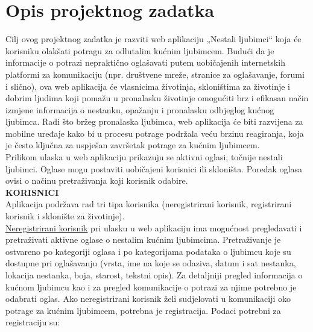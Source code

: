 \chapter{Opis projektnog zadatka}
		
		
		Cilj ovog projektnog zadatka je razviti web aplikaciju „Nestali ljubimci“ koja će korisniku olakšati potragu za odlutalim kućnim ljubimcem. Budući da je informacije o potrazi nepraktično oglašavati putem uobičajenih internetskih platformi za komunikaciju (npr. društvene mreže, stranice za oglašavanje, forumi i slično), ova web aplikacija će vlasnicima životinja, skloništima za životinje i dobrim ljudima koji pomažu u pronalasku životinje omogućiti brz i efikasan način izmjene informacija o nestanku, opažanju i pronalasku odbjeglog kućnog ljubimca. Radi što bržeg pronalaska ljubimca, web aplikacija će biti razvijena za mobilne uređaje kako bi u procesu potrage podržala veću brzinu reagiranja, koja je često ključna za uspješan završetak potrage za kućnim ljubimcem.\\
		
		Prilikom ulaska u web aplikaciju prikazuju se aktivni oglasi, točnije nestali ljubimci. Oglase mogu postaviti uobičajeni korisnici ili skloništa. Poredak oglasa ovisi o načinu pretraživanja koji korisnik odabire. \\
		
		\textbf{KORISNICI}\\
		Aplikacija podržava rad tri tipa korisnika (neregistrirani korisnik, registrirani korisnik i sklonište za životinje).\\
		\underline{Neregistrirani korisnik} pri ulasku u web aplikaciju ima mogućnost pregledavati i pretraživati aktivne oglase o nestalim kućnim ljubimcima. Pretraživanje je ostvareno po kategoriji oglasa i po kategorijama podataka o ljubimcu koje su dostupne pri oglašavanju (vrsta, ime na koje se odaziva, datum i sat nestanka, lokacija nestanka, boja, starost, tekstni opis). Za detaljniji pregled informacija o kućnom ljubimcu kao i za pregled komunikacije o potrazi za njime potrebno je odabrati oglas. Ako neregistrirani korisnik želi sudjelovati u komunikaciji oko potrage za kućnim ljubimcem, potrebna je registracija.
		Podaci potrebni za registraciju su:

